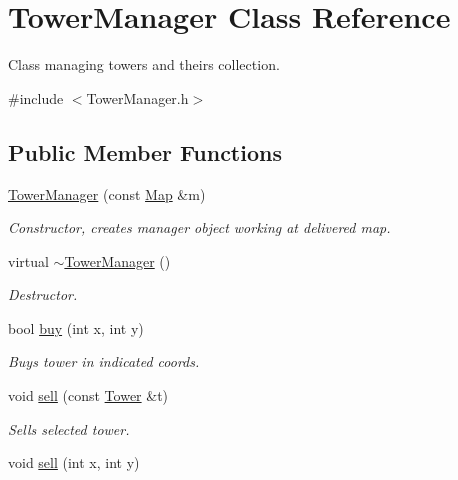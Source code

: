 \hypertarget{class_tower_manager}{}\section{Tower\+Manager Class Reference}
\label{class_tower_manager}


Class managing towers and theirs collection.  




{\ttfamily \#include $<$Tower\+Manager.\+h$>$}

\subsection*{Public Member Functions}
\begin{DoxyCompactItemize}
\item 
\mbox{\hyperlink{class_tower_manager_a709c5b86ae62f50820da54d535b83342}{Tower\+Manager}} (const \mbox{\hyperlink{class_map}{Map}} \&m)
\begin{DoxyCompactList}\small\item\em Constructor, creates manager object working at delivered map. \end{DoxyCompactList}\item 
\mbox{\label{class_tower_manager_aa2c2765238a8747803334c164e767e41}} 
virtual \mbox{\hyperlink{class_tower_manager_aa2c2765238a8747803334c164e767e41}{$\sim$\+Tower\+Manager}} ()
\begin{DoxyCompactList}\small\item\em Destructor. \end{DoxyCompactList}\item 
bool \mbox{\hyperlink{class_tower_manager_a72ecf5954505cd071860b4468669c5bd}{buy}} (int x, int y)
\begin{DoxyCompactList}\small\item\em Buys tower in indicated coords. \end{DoxyCompactList}\item 
void \mbox{\hyperlink{class_tower_manager_ab1b232f3361916be0442ccdcaca30df6}{sell}} (const \mbox{\hyperlink{class_tower}{Tower}} \&t)
\begin{DoxyCompactList}\small\item\em Sells selected tower. \end{DoxyCompactList}\item 
void \mbox{\hyperlink{class_tower_manager_a3ccb8e040306022ef0ac2d54787a122d}{sell}} (int x, int y)

\end{DoxyCompactItemize}
